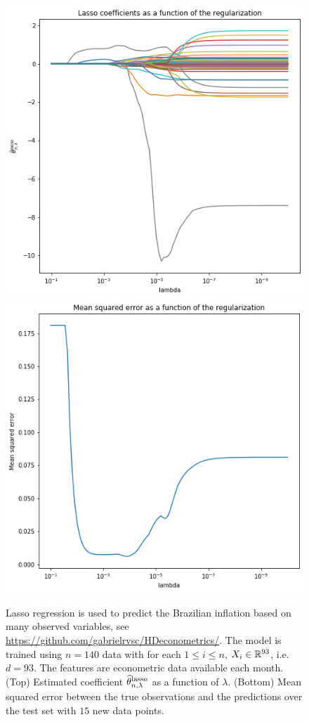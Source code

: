 \begin{figure}
\begin{center}
\includegraphics[width = .7\linewidth]{./Illustrations/lasso_coef.png}
\includegraphics[width = .7\linewidth]{./Illustrations/lasso_rmse_test.png}
\end{center}
\caption{Lasso regression is used to predict the Brazilian inflation based on many observed variables, see \url{https://github.com/gabrielrvsc/HDeconometrics/}. The model is trained using $n=140$ data with for each $1\leqslant i \leqslant n$, $X_i\in\mathbb{R}^{93}$, i.e. $d  =93$. The features are econometric data available each month. (Top) Estimated coefficient $\widehat {\theta}^{\mathrm{lasso}}_{n,\lambda}$ as a function of $\lambda$. (Bottom) Mean squared error between the true observations and the predictions over the test set with $15$ new data points.}
\end{figure}



